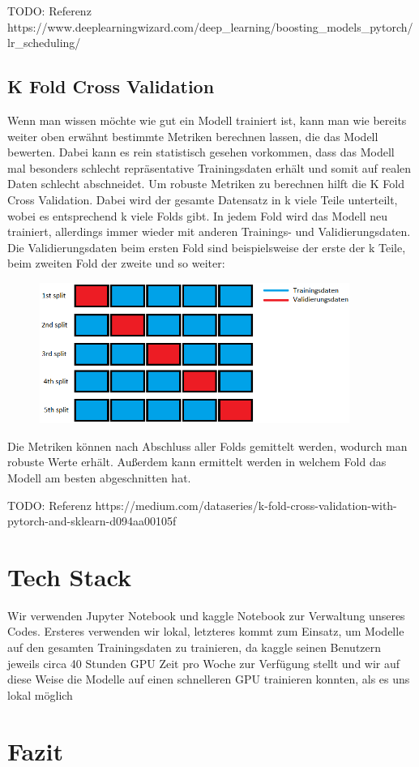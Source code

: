 \documentclass[12pt, a4paper]{article}
\begin{document}
TODO: Referenz https://www.deeplearningwizard.com/deep_learning/boosting_models_pytorch/lr_scheduling/

\subsection{K Fold Cross Validation}
Wenn man wissen möchte wie gut ein Modell trainiert ist, kann man wie bereits weiter oben erwähnt bestimmte Metriken berechnen lassen, die das Modell bewerten. Dabei kann es rein statistisch gesehen vorkommen, dass das Modell mal besonders schlecht repräsentative Trainingsdaten erhält und somit auf realen Daten schlecht abschneidet. Um robuste Metriken zu berechnen hilft die K Fold Cross Validation. Dabei wird der gesamte Datensatz in k viele Teile unterteilt, wobei es entsprechend k viele Folds gibt. In jedem Fold wird das Modell neu trainiert, allerdings immer wieder mit anderen Trainings- und Validierungsdaten. Die Validierungsdaten beim ersten Fold sind beispielsweise der erste der k Teile, beim zweiten Fold der zweite und so weiter:
\begin{figure}[h]
\centering
\includegraphics[width=0.9\textwidth]{folds.png}
\end{figure}
Die Metriken können nach Abschluss aller Folds gemittelt werden, wodurch man robuste Werte erhält. Außerdem kann ermittelt werden in welchem Fold das Modell am besten abgeschnitten hat.

TODO: Referenz https://medium.com/dataseries/k-fold-cross-validation-with-pytorch-and-sklearn-d094aa00105f

\section{Tech Stack}
Wir verwenden Jupyter Notebook und kaggle Notebook zur Verwaltung unseres Codes. Ersteres verwenden wir lokal, letzteres kommt zum Einsatz, um Modelle auf den gesamten Trainingsdaten zu trainieren, da kaggle seinen Benutzern jeweils circa 40 Stunden GPU Zeit pro Woche zur Verfügung stellt und wir auf diese Weise die Modelle auf einen schnelleren GPU trainieren konnten, als es uns lokal möglich

\section{Fazit}
\end{document}
